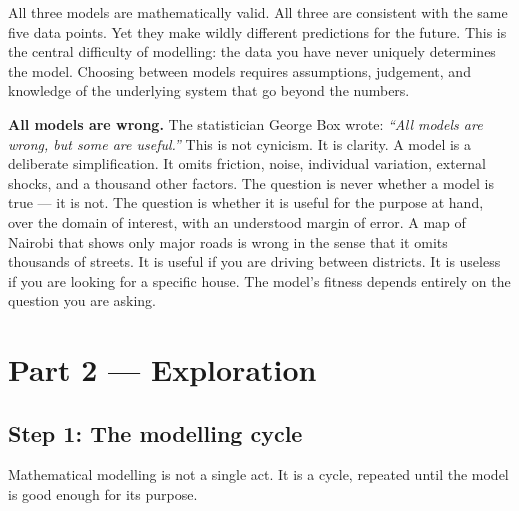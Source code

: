 \documentclass[12pt, a4paper]{article}
\begin{document}
\medskip
All three models are mathematically valid. All three are consistent with the same five data points. Yet they make wildly different predictions for the future. This is the central difficulty of modelling: the data you have never uniquely determines the model. Choosing between models requires assumptions, judgement, and knowledge of the underlying system that go beyond the numbers.

\begin{thought}
\textbf{All models are wrong.}
The statistician George Box wrote: \textit{``All models are wrong, but some are useful.''} This is not cynicism. It is clarity. A model is a deliberate simplification. It omits friction, noise, individual variation, external shocks, and a thousand other factors. The question is never whether a model is true --- it is not. The question is whether it is useful for the purpose at hand, over the domain of interest, with an understood margin of error. A map of Nairobi that shows only major roads is wrong in the sense that it omits thousands of streets. It is useful if you are driving between districts. It is useless if you are looking for a specific house. The model's fitness depends entirely on the question you are asking.
\end{thought}

\section{Part 2 \texorpdfstring{---}{--} Exploration}

\subsection{Step 1: The modelling cycle}

Mathematical modelling is not a single act. It is a cycle, repeated until the model is good enough for its purpose.
\end{document}
